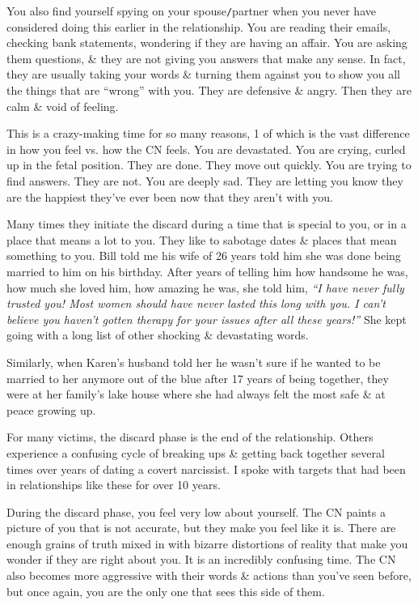 \documentclass{article}
\numberwithin{equation}{section}
\begin{document}
You also find yourself spying on your spouse\texttt{/}partner when you never have considered doing this earlier in the relationship. You are reading their emails, checking bank statements, wondering if they are having an affair. You are asking them questions, \& they are not giving you answers that make any sense. In fact, they are usually taking your words \& turning them against you to show you all the things that are ``wrong'' with you. They are defensive \& angry. Then they are calm \& void of feeling.

This is a crazy-making time for so many reasons, 1 of which is the vast difference in how you feel vs. how the CN feels. You are devastated. You are crying, curled up in the fetal position. They are done. They move out quickly. You are trying to find answers. They are not. You are deeply sad. They are letting you know they are the happiest they've ever been now that they aren't with you.

Many times they initiate the discard during a time that is special to you, or in a place that means a lot to you. They like to sabotage dates \& places that mean something to you. Bill told me his wife of 26 years told him she was done being married to him on his birthday. After years of telling him how handsome he was, how much she loved him, how amazing he was, she told him, \textit{``I have never fully trusted you! Most women should have never lasted this long with you. I can't believe you haven't gotten therapy for your issues after all these years!''} She kept going with a long list of other shocking \& devastating words.

Similarly, when Karen's husband told her he wasn't sure if he wanted to be married to her anymore out of the blue after 17 years of being together, they were at her family's lake house where she had always felt the most safe \& at peace growing up.

For many victims, the discard phase is the end of the relationship. Others experience a confusing cycle of breaking ups \& getting back together several times over years of dating a covert narcissist. I spoke with targets that had been in relationships like these for over 10 years.

During the discard phase, you feel very low about yourself. The CN paints a picture of you that is not accurate, but they make you feel like it is. There are enough grains of truth mixed in with bizarre distortions of reality that make you wonder if they are right about you. It is an incredibly confusing time. The CN also becomes more aggressive with their words \& actions than you've seen before, but once again, you are the only one that sees this side of them.
\end{document}
